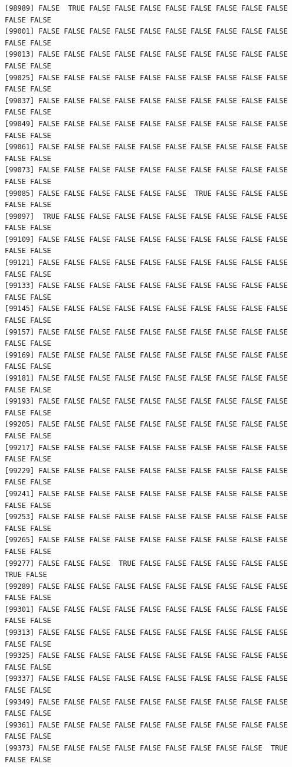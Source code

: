 \documentclass[
  a4paper,
  DIV=11,
  numbers=noendperiod]{scrartcl}
\begin{document}
\begin{verbatim}
[98989] FALSE  TRUE FALSE FALSE FALSE FALSE FALSE FALSE FALSE FALSE FALSE FALSE
[99001] FALSE FALSE FALSE FALSE FALSE FALSE FALSE FALSE FALSE FALSE FALSE FALSE
[99013] FALSE FALSE FALSE FALSE FALSE FALSE FALSE FALSE FALSE FALSE FALSE FALSE
[99025] FALSE FALSE FALSE FALSE FALSE FALSE FALSE FALSE FALSE FALSE FALSE FALSE
[99037] FALSE FALSE FALSE FALSE FALSE FALSE FALSE FALSE FALSE FALSE FALSE FALSE
[99049] FALSE FALSE FALSE FALSE FALSE FALSE FALSE FALSE FALSE FALSE FALSE FALSE
[99061] FALSE FALSE FALSE FALSE FALSE FALSE FALSE FALSE FALSE FALSE FALSE FALSE
[99073] FALSE FALSE FALSE FALSE FALSE FALSE FALSE FALSE FALSE FALSE FALSE FALSE
[99085] FALSE FALSE FALSE FALSE FALSE FALSE  TRUE FALSE FALSE FALSE FALSE FALSE
[99097]  TRUE FALSE FALSE FALSE FALSE FALSE FALSE FALSE FALSE FALSE FALSE FALSE
[99109] FALSE FALSE FALSE FALSE FALSE FALSE FALSE FALSE FALSE FALSE FALSE FALSE
[99121] FALSE FALSE FALSE FALSE FALSE FALSE FALSE FALSE FALSE FALSE FALSE FALSE
[99133] FALSE FALSE FALSE FALSE FALSE FALSE FALSE FALSE FALSE FALSE FALSE FALSE
[99145] FALSE FALSE FALSE FALSE FALSE FALSE FALSE FALSE FALSE FALSE FALSE FALSE
[99157] FALSE FALSE FALSE FALSE FALSE FALSE FALSE FALSE FALSE FALSE FALSE FALSE
[99169] FALSE FALSE FALSE FALSE FALSE FALSE FALSE FALSE FALSE FALSE FALSE FALSE
[99181] FALSE FALSE FALSE FALSE FALSE FALSE FALSE FALSE FALSE FALSE FALSE FALSE
[99193] FALSE FALSE FALSE FALSE FALSE FALSE FALSE FALSE FALSE FALSE FALSE FALSE
[99205] FALSE FALSE FALSE FALSE FALSE FALSE FALSE FALSE FALSE FALSE FALSE FALSE
[99217] FALSE FALSE FALSE FALSE FALSE FALSE FALSE FALSE FALSE FALSE FALSE FALSE
[99229] FALSE FALSE FALSE FALSE FALSE FALSE FALSE FALSE FALSE FALSE FALSE FALSE
[99241] FALSE FALSE FALSE FALSE FALSE FALSE FALSE FALSE FALSE FALSE FALSE FALSE
[99253] FALSE FALSE FALSE FALSE FALSE FALSE FALSE FALSE FALSE FALSE FALSE FALSE
[99265] FALSE FALSE FALSE FALSE FALSE FALSE FALSE FALSE FALSE FALSE FALSE FALSE
[99277] FALSE FALSE FALSE  TRUE FALSE FALSE FALSE FALSE FALSE FALSE  TRUE FALSE
[99289] FALSE FALSE FALSE FALSE FALSE FALSE FALSE FALSE FALSE FALSE FALSE FALSE
[99301] FALSE FALSE FALSE FALSE FALSE FALSE FALSE FALSE FALSE FALSE FALSE FALSE
[99313] FALSE FALSE FALSE FALSE FALSE FALSE FALSE FALSE FALSE FALSE FALSE FALSE
[99325] FALSE FALSE FALSE FALSE FALSE FALSE FALSE FALSE FALSE FALSE FALSE FALSE
[99337] FALSE FALSE FALSE FALSE FALSE FALSE FALSE FALSE FALSE FALSE FALSE FALSE
[99349] FALSE FALSE FALSE FALSE FALSE FALSE FALSE FALSE FALSE FALSE FALSE FALSE
[99361] FALSE FALSE FALSE FALSE FALSE FALSE FALSE FALSE FALSE FALSE FALSE FALSE
[99373] FALSE FALSE FALSE FALSE FALSE FALSE FALSE FALSE FALSE  TRUE FALSE FALSE

\end{verbatim}
\end{document}
